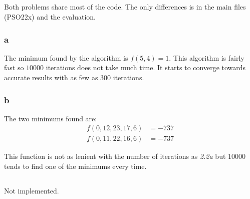 \documentclass{article}
\begin{document}
\subsection{}

Both problems share most of the code. The only differences is in the main files
(PSO22x) and the evaluation.

\subsubsection*{a}

The minimum found by the algorithm is $f(5,4) = 1$. This algorithm is fairly
fast so $10000$ iterations does not take much time. It starts to converge
towards accurate results with as few as $300$ iterations.

\subsubsection*{b}

The two minimums found are:
\begin{align*}
  f(0, 12, 23, 17, 6) &= -737 \\
  f(0, 11, 22, 16, 6) &= -737
\end{align*}

This function is not as lenient with the number of iterations as \emph{2.2a} but
$10000$ tends to find one of the minimums every time.

\subsection{}
Not implemented.

\subsection{}
\end{document}
